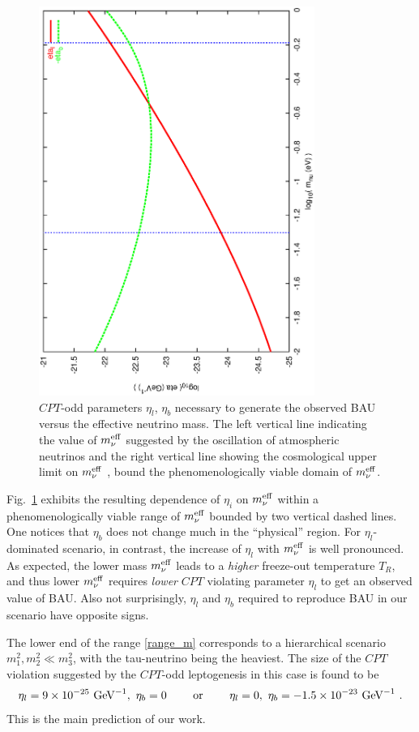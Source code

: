 \documentclass[12pt]{revtex4}
\newcommand{\meff}{m^{\rm eff}_\nu}
\newcommand{\GeV}{{\rm GeV}}
\begin{document}
	\begin{figure}
\includegraphics[width=9cm,angle=270]{scan_log.ps}
\caption{$CPT$-odd parameters $ \eta_l $, $ \eta_b $ necessary to generate
	the observed BAU versus the effective neutrino mass.
	The left vertical line indicating the value of $ \meff $ suggested by the oscillation of atmospheric
neutrinos and the right vertical line showing the cosmological upper 
	limit on $ \meff $ \cite{Hannestad:2003ye}, bound the phenomenologically viable domain of $\meff$. }
\label{scan_fig}
\end{figure}
	
Fig.~\ref{scan_fig} exhibits the resulting dependence of $\eta_i$ on $\meff$ within a phenomenologically
	viable range of $ \meff $ bounded by two vertical dashed lines.
	One notices that $ \eta_b$ does not change much in the ``physical'' region.
	For $ \eta_l $-dominated scenario, in contrast, the increase of $\eta_l$ with 
	$ \meff $ is well pronounced. As expected, the lower mass $\meff$ leads to a 
{\em higher} freeze-out temperature $T_R$, and thus lower $\meff$ requires {\em lower}
$CPT$ violating parameter $\eta_l$ to get an observed value of BAU. Also not surprisingly, $\eta_l$ and 
$\eta_b$ required to reproduce BAU in our scenario have opposite signs. 
	
The lower end of the range \eqref{range_m} corresponds to a hierarchical 
scenario $m_1^2,m_2^2 \ll m_3^2$, with the tau-neutrino being the heaviest. 
The size of the $CPT$ violation suggested by the $CPT$-odd leptogenesis 
in this case is found to be
\begin{eqnarray}
\label{main_result}
	\eta_l = 9 \times 10^{-25} ~\GeV^{-1},~ \eta_b = 0
	~~~~~~~ {\rm or} ~~~~~~~ 
	\eta_l = 0, ~\eta_b = -1.5 \times 10^{-23} ~\GeV^{-1}~.
\end{eqnarray}
This is the main prediction of our work. 
\end{document}
